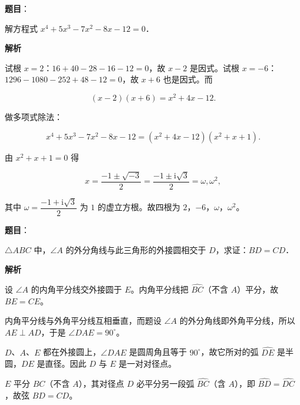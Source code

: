 \begin{answer}

\textbf{题目}：

解方程式 $x^4+5x^3-7x^2-8x-12=0$．

\textbf{解析}

试根 $x=2$：$16+40-28-16-12=0$，故 $x-2$ 是因式。试根 $x=-6$：$1296-1080-252+48-12=0$，故 $x+6$ 也是因式。而

\nopagebreak[4]
\[
(x-2)(x+6)=x^2+4x-12.
\]

做多项式除法：

\nopagebreak[4]
\[
x^4+5x^3-7x^2-8x-12=(x^2+4x-12)(x^2+x+1).
\]

由 $x^2+x+1=0$ 得

\nopagebreak[4]
\[
x=\dfrac{-1\pm\sqrt{-3}}{2}=\dfrac{-1\pm\mathrm i\sqrt3}{2}=\omega,\omega^2,
\]

其中 $\omega=\dfrac{-1+\mathrm i\sqrt3}{2}$ 为 $1$ 的虚立方根。故四根为 $2$，$-6$，$\omega$，$\omega^2$。


\end{answer}
\begin{answer}

\textbf{题目}：

$\triangle ABC$ 中，$\angle A$ 的外分角线与此三角形的外接圆相交于 $D$，求证：$BD=CD$．

\textbf{解析}

设 $\angle A$ 的内角平分线交外接圆于 $E$。内角平分线把 $\widehat{BC}$（不含 $A$）平分，故 $BE=CE$。

内角平分线与外角平分线互相垂直，而题设 $\angle A$ 的外分角线即外角平分线，所以 \mbox{$AE\perp AD$}，于是 \mbox{$\angle DAE=90^\circ$}。

$D$、$A$、$E$ 都在外接圆上，$\angle DAE$ 是圆周角且等于 $90^\circ$，故它所对的弧 $\widehat{DE}$ 是半圆，$DE$ 是直径。因此 $D$ 与 $E$ 是一对对径点。

$E$ 平分 $\widehat{BC}$（不含 $A$），其对径点 $D$ 必平分另一段弧 $\widehat{BC}$（含 $A$），即 $\widehat{BD}=\widehat{DC}$，故弦 $BD=CD$。


\end{answer}
